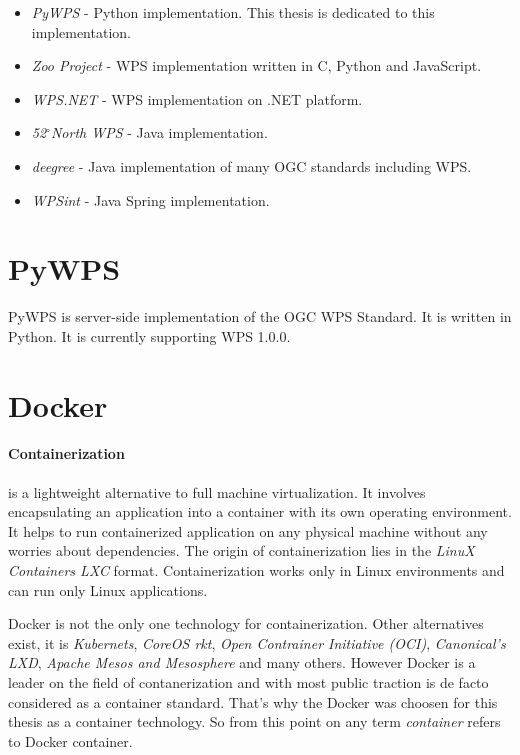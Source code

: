 \documentclass[12pt,a4paper]{article}
\begin{document}
\begin{itemize}
\item \textit{PyWPS} - Python implementation. This thesis is dedicated to this implementation.
\item \textit{Zoo Project} - WPS implementation written in C, Python and JavaScript.
\item \textit{WPS.NET} - WPS implementation on .NET platform.
\item \textit{52$^{\circ}$North WPS} - Java implementation.
\item \textit{deegree} - Java implementation of many OGC standards including WPS.
\item \textit{WPSint} - Java Spring implementation.
\end{itemize}

\newpage
\section{PyWPS}
PyWPS is server-side implementation of the OGC WPS Standard. It is written in Python. It is currently supporting WPS 1.0.0.

\newpage
\section{Docker}
\paragraph{Containerization} is a lightweight alternative to full machine virtualization. It involves encapsulating an application 
into a container with its own operating environment. It helps to run containerized application on any physical machine without any
worries about dependencies. The origin of containerization lies in the \textit{LinuX Containers {LXC}} format. Containerization
works only in Linux environments and can run only Linux applications.

Docker is not the only one technology for containerization. Other alternatives exist, it is \textit{Kubernets}, \textit{CoreOS rkt}, 
\textit{Open Contrainer Initiative (OCI)}, \textit{Canonical's LXD}, \textit{Apache Mesos and Mesosphere} and many others. 
However Docker is a leader on the field of contanerization and with most public traction is de facto considered as a container standard.
That's why the Docker was choosen for this thesis as a container technology. So from this point on any term \textit{container} refers to
Docker container.
\end{document}
